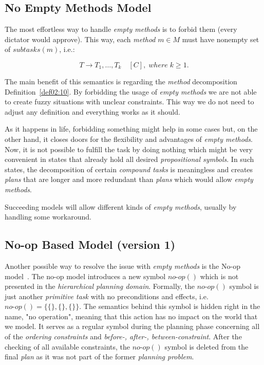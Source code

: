 \subsection{No Empty Methods Model}\label{sub03:311}

\medskip\noindent
The most effortless way to handle \emph{empty methods} is to forbid them (every dictator would approve). This way, each \emph{method} $m \in M$ must have nonempty set of $subtasks(m)$, i.e.:

\[
    T \rightarrow T_1,\dots,T_k \quad [C], \; where \; k \geq 1.
\]

\noindent
The main benefit of this semantics is regarding the \emph{method} decomposition Definition~\ref{def02:10}. By forbidding the usage of \emph{empty methods} we are not able to create fuzzy situations with unclear constraints. This way we do not need to adjust any definition and everything works as it should.

\medskip\noindent
As it happens in life, forbidding something might help in some cases but, on the other hand, it closes doors for the flexibility and advantages of \emph{empty methods}. Now, it is not possible to fulfill the task by doing nothing which might be very convenient in states that already hold all desired \emph{propositional symbols}. In such states, the decomposition of certain \emph{compound tasks} is meaningless and creates \emph{plans} that are longer and more redundant than \emph{plans} which would allow \emph{empty methods}.

\medskip\noindent
Succeeding models will allow different kinds of \emph{empty methods}, usually by handling some workaround.

\subsection{No-op Based Model (version 1)}

\medskip\noindent
Another possible way to resolve the issue with \emph{empty methods} is the No-op model~\cite{ondrckova2023semantics}. The no-op model introduces a new symbol $no\text{-}op()$ which is not presented in the \emph{hierarchical planning domain}. Formally, the $no\text{-}op()$ symbol is just another \emph{primitive task} with no preconditions and effects, i.e. $no\text{-}op() = \{\{\}, \{\}, \{\}\}$. The semantics behind this symbol is hidden right in the name, "no operation", meaning that this action has no impact on the world that we model. It serves as a regular symbol during the planning phase concerning all of the \emph{ordering constraints} and \emph{before-, after-, between-constraint}. After the checking of all available constraints, the $no\text{-}op()$ symbol is deleted from the final \emph{plan} as it was not part of the former \emph{planning problem}.

